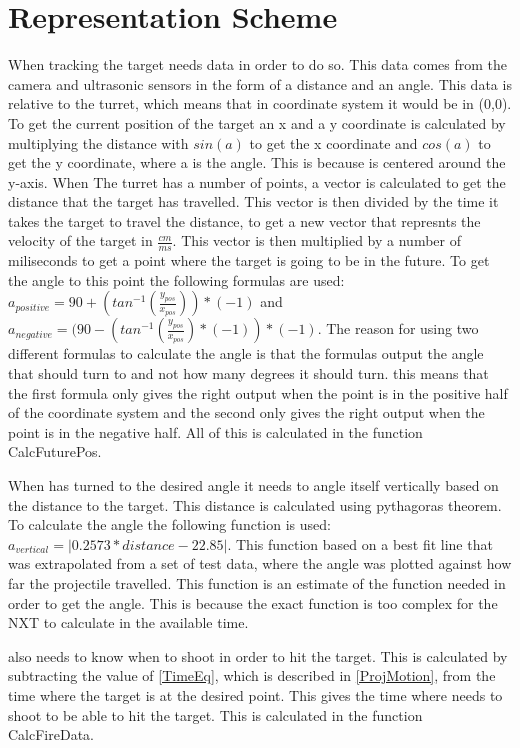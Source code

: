 \chapter{Representation Scheme}\label{RepScheme}
When tracking the target \name needs data in order to do so. This data comes
from the camera and ultrasonic sensors in the form of a distance and an angle.
This data is relative to the turret, which means that in coordinate system it
would be in (0,0). To get the current position of the target an x and a y
coordinate is calculated by multiplying the distance with $sin(a)$ to get the x coordinate and
$cos(a)$ to get the y coordinate, where a is the angle. This is because \name is
centered around the y-axis. When The turret has a number of points, a vector is
calculated to get the distance that the target has travelled. This vector is
then divided by the time it takes the target to travel the distance, to get a new vector that represnts the
velocity of the target in $\frac{cm}{ms}$. This vector is then multiplied by a
number of miliseconds to get a point where the target is going to be in the
future. To get the angle to this point the following formulas are used:
$a_{positive}=90+(tan^{-1}(\frac{y_{pos}}{x_{pos}}))*(-1)$ and
$a_{negative}=(90-(tan^{-1}(\frac{y_{pos}}{x_{pos}})*(-1))*(-1)$. The reason for
using two different formulas to calculate the angle is that the formulas output
the angle that \name should turn to and not how many degrees it should turn.
this means that the first formula only gives the right output when the point is
in the positive half of the coordinate system and the second only gives the
right output when the point is in the negative half. All of this is
calculated in the function CalcFuturePos.\nl


When \name has turned to the desired angle it needs to angle itself vertically
based on the distance to the target. This distance is calculated using
pythagoras theorem. To calculate the angle the following function is used:\\
$a_{vertical}=| 0.2573*distance-22.85 |$.
This function based on a best fit line that was extrapolated from a set of test
data, where the angle was plotted against how far the projectile travelled. This
function is an estimate of the function needed in order to get the angle. This
is because the exact function is too complex for the NXT to calculate in the available time.\nl
 
\name also needs to know when to shoot in order to hit the target.
This is calculated by subtracting the value of \autoref{TimeEq}, which is described in
\autoref{ProjMotion}, from the time where the target is at the desired point.
This gives the time where \name needs to shoot to be able to hit the target.
This is calculated in the function CalcFireData.
